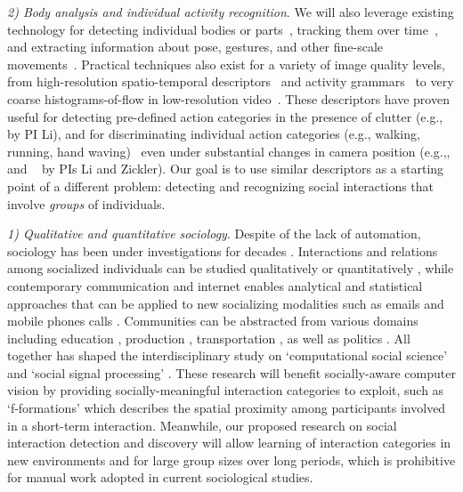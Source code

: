 \emph{2) Body analysis and individual activity recognition}. We will also leverage existing technology for detecting individual bodies or  parts~\cite{Dalal:HOG,poselet,pose_part}, tracking them over time~\cite{RamananFZ07,EshelM10}, and extracting information about pose, gestures, and other fine-scale movements~\cite{Mitra:gesture,Ryoo:action,Poppe}. Practical techniques also exist for a variety of image quality levels, from high-resolution spatio-temporal descriptors~\cite{Dollar:STIP,Laptev:STIP,Brox:flow} and activity grammars~\cite{Niebles2007,Niebles2006} to very coarse histograms-of-flow in low-resolution video~\cite{EfrosBMM03}. These descriptors have proven useful for detecting pre-defined action categories in the presence of clutter (e.g.,~\cite{Li2010} by PI Li), and for discriminating individual action categories (e.g., walking, running, hand waving)~\cite{Weizmann,KTH} even under substantial changes in camera position (e.g.,\cite{Weinland:invariance2}, and ~\cite{LiZickler2012} by PIs Li and Zickler). Our goal is to use similar descriptors as a starting point of a different problem: detecting and recognizing social interactions that involve \emph{groups} of individuals. 





\emph{1) Qualitative and quantitative sociology}. Despite of the lack of automation, sociology has been under investigations for decades \cite{Darwin,Thomkins,Goffman,Kendon1990,Ekman,Hoyle,Tannen}. Interactions and relations among socialized individuals can be studied qualitatively or quantitatively \cite{Goodwin2000,Goldin,Goodwin2007,Kendon2010}, while contemporary communication and internet enables analytical and statistical approaches that can be applied to new socializing modalities such as emails \cite{Eckmann} and mobile phones calls \cite{Onnela,Eagle}. Communities can be abstracted from various domains including education \cite{Scherr2009}, production \cite{Watts}, transportation \cite{Gonzalez},  as well as politics \cite{Iacus}. All together has shaped the interdisciplinary study on `computational social science' \cite{Lazer2009} and `social signal processing' \cite{Pantic}. These research will benefit socially-aware computer vision by providing socially-meaningful interaction categories to exploit, such as `f-formations' \cite{Kendon1990} which describes the spatial proximity among participants involved in a short-term interaction. Meanwhile, our proposed research on social interaction detection and discovery will allow learning of interaction categories in new environments and for large group sizes over long periods, which is prohibitive for manual work adopted in current sociological studies.


